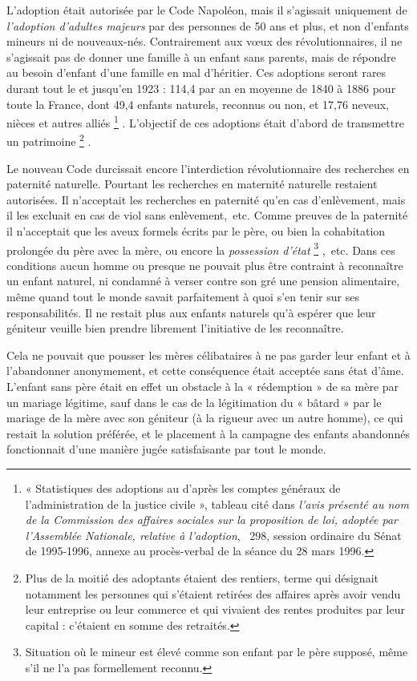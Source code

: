  L'adoption était autorisée par le Code Napoléon, mais il s'agissait uniquement de \emph{l'adoption d'adultes majeurs} par des personnes de 50 ans et plus, et non d'enfants mineurs ni de nouveaux-nés. Contrairement aux vœux des révolutionnaires, il ne s'agissait pas de donner une famille à un enfant sans parents, mais de répondre au besoin d'enfant d'une famille en mal d'héritier. Ces adoptions seront rares durant tout le  et jusqu'en 1923 : 114,4 par an en moyenne de 1840 à 1886 pour toute la France, dont 49,4 enfants naturels, reconnus ou non, et 17,76 neveux, nièces et autres alliés%
\footnote{« Statistiques des adoptions au  d'après les comptes généraux de l'administration de la justice civile », tableau cité dans \emph{l'avis présenté au nom de la Commission des affaires sociales sur la proposition de loi, adoptée par l'Assemblée Nationale, relative à l'adoption}, \no~298, session ordinaire du Sénat de 1995-1996, annexe au procès-verbal de la séance du 28 mars 1996.}%
. L'objectif de ces adoptions était d'abord de transmettre un patrimoine%
\footnote{Plus de la moitié des adoptants étaient des rentiers, terme qui désignait notamment les personnes qui s'étaient retirées des affaires après avoir vendu leur entreprise ou leur commerce et qui vivaient des rentes produites par leur capital : c'étaient en somme des retraités.}%
. 

 Le nouveau Code durcissait encore l'interdiction révolutionnaire des recherches en paternité naturelle. Pourtant les recherches en maternité naturelle restaient autorisées. Il n'acceptait les recherches en paternité qu'en cas d'enlèvement, mais il les excluait en cas de viol sans enlèvement,~etc. Comme preuves de la paternité il n'acceptait que les aveux formels écrits par le père, ou bien la cohabitation prolongée du père avec la mère, ou encore la \emph{possession d'état}%
\footnote{Situation où le mineur est élevé comme son enfant par le père supposé, même s'il ne l'a pas formellement reconnu.}%
,~etc. Dans ces conditions aucun homme ou presque ne pouvait plus être contraint à reconnaître un enfant naturel, ni condamné à verser contre son gré une pension alimentaire, même quand tout le monde savait parfaitement à quoi s'en tenir sur ses responsabilités. Il ne restait plus aux enfants naturels qu'à espérer que leur géniteur veuille bien prendre librement l'initiative de les reconnaître. 

 Cela ne pouvait que pousser les mères célibataires à ne pas garder leur enfant et à l'abandonner anonymement, et cette conséquence était acceptée sans état d'âme. L'enfant sans père était en effet un obstacle à la « rédemption » de sa mère par un mariage légitime, sauf dans le cas de la légitimation du « bâtard » par le mariage de la mère avec son géniteur (à la rigueur avec un autre homme), ce qui restait la solution préférée, et le placement à la campagne des enfants abandonnés fonctionnait d'une manière jugée satisfaisante par tout le monde. 


